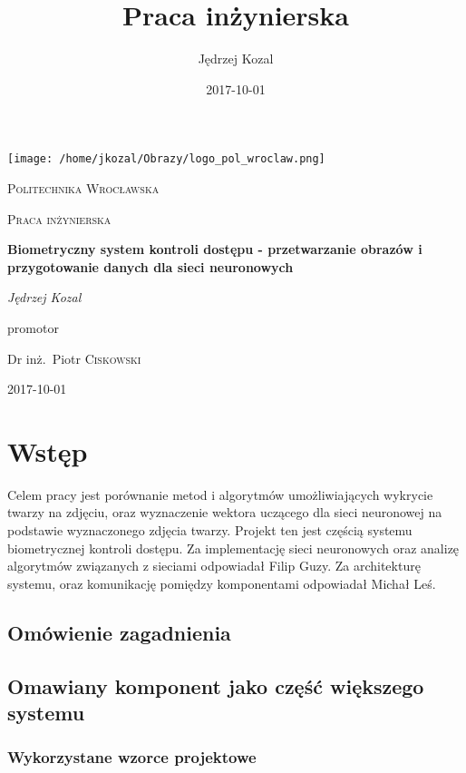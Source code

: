 \documentclass{article}
\title{Praca inżynierska}
\date{2017-10-01}
\author{Jędrzej Kozal}
\begin{document}
\begin{titlepage}
	\centering
	\texttt{[image: /home/jkozal/Obrazy/logo\_pol\_wroclaw.png]}\par\vspace{1cm}
	{\scshape\LARGE Politechnika Wrocławska \par}
	\vspace{1cm}
	{\scshape\Large Praca inżynierska\par}
	\vspace{1.5cm}
	{\huge\bfseries Biometryczny system kontroli dostępu - przetwarzanie obrazów i przygotowanie danych dla sieci neuronowych \par}
	\vspace{2cm}
	{\Large\itshape Jędrzej Kozal\par}
	\vfill
	promotor\par
	Dr inż.~Piotr \textsc{Ciskowski}

	\vfill

	{\large 2017-10-01\par}
\end{titlepage}


\section{Wstęp}
Celem pracy jest porównanie metod i algorytmów umożliwiających wykrycie twarzy na zdjęciu, oraz wyznaczenie wektora uczącego dla sieci neuronowej na podstawie wyznaczonego zdjęcia twarzy. Projekt ten jest częścią systemu biometrycznej kontroli dostępu. Za implementację sieci neuronowych oraz analizę algorytmów związanych z sieciami odpowiadał Filip Guzy. Za architekturę systemu, oraz komunikację pomiędzy komponentami odpowiadał Michał Leś.
\subsection{Omówienie zagadnienia}

\subsection{Omawiany komponent jako część większego systemu}
\subsubsection{Wykorzystane wzorce projektowe}
\end{document}

